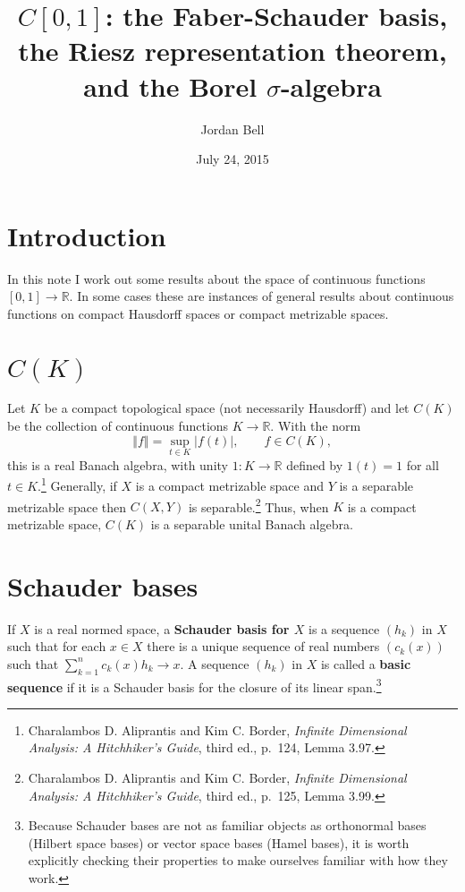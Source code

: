 \documentclass{article}
\newcommand{\norm}[1]{\left\Vert #1 \right\Vert}
\theoremstyle{definition}
\begin{document}
\title{$C[0,1]$: the Faber-Schauder basis,  the Riesz representation theorem, and the  Borel $\sigma$-algebra}
\author{Jordan Bell}
\date{July 24, 2015}

\maketitle

\section{Introduction}
In this note I work out some results about the space of continuous functions $[0,1] \to \mathbb{R}$. 
In some cases these are instances of general results about continuous functions on compact Hausdorff spaces or compact metrizable
spaces. 


\section{$C(K)$}
Let $K$ be a compact topological space (not necessarily Hausdorff) and let $C(K)$ be the collection of continuous functions $K \to \mathbb{R}$.
With the norm
\[
\norm{f} = \sup_{t \in K} |f(t)|,\qquad f \in C(K),
\]
this is a real Banach algebra, with unity $1:K \to \mathbb{R}$ defined by $1(t)=1$ for all $t \in K$.\footnote{Charalambos D. Aliprantis
and Kim C. Border, {\em Infinite Dimensional Analysis: A Hitchhiker's Guide}, third ed., p.~124, Lemma 3.97.}
Generally, if $X$ is a compact metrizable space and 
$Y$ is a separable metrizable space then $C(X,Y)$ is separable.\footnote{Charalambos D. Aliprantis
and Kim C. Border, {\em Infinite Dimensional Analysis: A Hitchhiker's Guide}, third ed., p.~125, Lemma 3.99.}
Thus, when $K$ is a compact metrizable space, $C(K)$ is a separable unital Banach algebra. 


\section{Schauder bases}
If $X$ is a real normed space, a \textbf{Schauder basis for $X$} is a 
sequence $(h_k)$ in $X$ such that for each $x \in X$ there is a unique sequence of real numbers $(c_k(x))$ such that 
$\sum_{k=1}^n c_k(x) h_k \to x$. A sequence $(h_k)$ in $X$ is called a \textbf{basic sequence} if it is a Schauder basis for the closure of
its linear span.\footnote{Because Schauder bases are not as familiar objects as orthonormal bases (Hilbert space
bases) or vector space
bases (Hamel bases), it is worth explicitly checking their properties to make ourselves familiar with how they work.}
\end{document}
